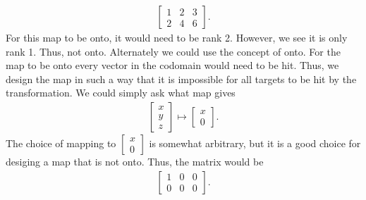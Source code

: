 \documentclass{report}
\begin{document}
\begin{itemize}
\begin{itemize}
                \begin{align*}
                    \begin{bmatrix} 1 & 2 & 3 \\ 2 & 4 & 6\end{bmatrix}
                .\end{align*}
                \bigbreak \noindent 
                For this map to be onto, it would need to be rank 2. However, we see it is only rank 1. Thus, not onto.
                \bigbreak \noindent 
                Alternately we could use the concept of onto. For the map to be onto every vector in the codomain would need to be hit. Thus, we design the map in such a way that it is impossible for all targets to be hit by the transformation.
                \bigbreak \noindent 
                We could simply ask what map gives
                \begin{align*}
                   \begin{bmatrix} x \\ y \\ z \end{bmatrix} 
                   \mapsto \begin{bmatrix} x \\ 0  \end{bmatrix}
                .\end{align*}
                The choice of mapping to $\begin{bmatrix}x \\ 0  \end{bmatrix} $ is somewhat arbitrary, but it is a good choice for desiging a map that is not onto. Thus, the matrix would be
                \begin{align*}
                    \begin{bmatrix} 1 & 0 & 0 \\ 0 & 0 & 0 \end{bmatrix}
                .\end{align*}


\end{itemize}
\end{itemize}
\end{document}
